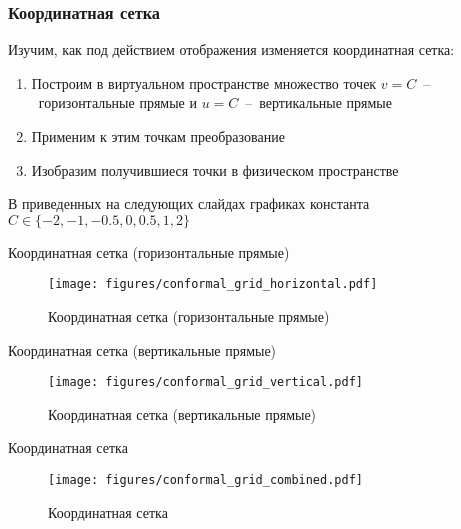 \begin{frame}\frametitle{Координатная сетка}
  Изучим, как под действием отображения изменяется координатная сетка:
  \begin{enumerate}
    \item Построим в виртуальном пространстве множество точек
      \(v = C\)~--~горизонтальные прямые и \(u = C\)~--~вертикальные прямые
    \item Применим к этим точкам преобразование
    \item Изобразим получившиеся точки в физическом пространстве
  \end{enumerate}

  В приведенных на следующих слайдах графиках константа \(C \in \{-2, -1, -0.5, 0, 0.5, 1, 2\}\)
\end{frame}

\begin{frame}{Координатная сетка (горизонтальные прямые)}
	\begin{figure}
		\centering
		\texttt{[image: figures/conformal\_grid\_horizontal.pdf]}
		\caption{Координатная сетка (горизонтальные прямые)}\label{fig:conformal_grid_horizontal}
	\end{figure}
\end{frame}

\begin{frame}{Координатная сетка (вертикальные прямые)}
	\begin{figure}
		\centering
		\texttt{[image: figures/conformal\_grid\_vertical.pdf]}
		\caption{Координатная сетка (вертикальные прямые)}\label{fig:conformal_grid_vertical}
	\end{figure}
\end{frame}


\begin{frame}{Координатная сетка}
	\begin{figure}
		\centering
		\texttt{[image: figures/conformal\_grid\_combined.pdf]}
		\caption{Координатная сетка}\label{fig:conformal_grid}
	\end{figure}
\end{frame}
